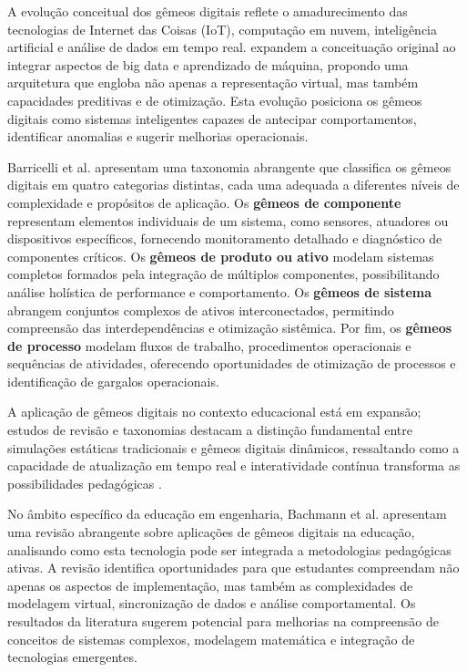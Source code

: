 \documentclass[12pt,a4paper]{article}
\begin{document}
A evolução conceitual dos gêmeos digitais reflete o amadurecimento das
tecnologias de Internet das Coisas (IoT), computação em nuvem, inteligência
artificial e análise de dados em tempo real. \citet{tao2018} expandem
a conceituação original ao integrar aspectos de big data e aprendizado de
máquina, propondo uma arquitetura que engloba não apenas a representação
virtual, mas também capacidades preditivas e de otimização. Esta evolução
posiciona os gêmeos digitais como sistemas inteligentes capazes de antecipar
comportamentos, identificar anomalias e sugerir melhorias operacionais.

Barricelli et al. \cite{barricelli2019} apresentam uma taxonomia abrangente que
classifica os gêmeos digitais em quatro categorias distintas, cada uma adequada
a diferentes níveis de complexidade e propósitos de aplicação. Os
\textbf{gêmeos de componente} representam elementos individuais de um sistema,
como sensores, atuadores ou dispositivos específicos, fornecendo monitoramento
detalhado e diagnóstico de componentes críticos. Os \textbf{gêmeos de produto
  ou ativo} modelam sistemas completos formados pela integração de múltiplos
componentes, possibilitando análise holística de performance e comportamento.
Os \textbf{gêmeos de sistema} abrangem conjuntos complexos de ativos
interconectados, permitindo compreensão das interdependências e otimização
sistêmica. Por fim, os \textbf{gêmeos de processo} modelam fluxos de trabalho,
procedimentos operacionais e sequências de atividades, oferecendo oportunidades
de otimização de processos e identificação de gargalos operacionais.

A aplicação de gêmeos digitais no contexto educacional está em expansão; estudos de revisão e taxonomias destacam a distinção fundamental entre simulações estáticas tradicionais e gêmeos digitais dinâmicos, ressaltando como a capacidade de atualização em tempo real e interatividade contínua transforma as possibilidades pedagógicas \cite{barricelli2019}.

No âmbito específico da educação em engenharia, Bachmann et al.
apresentam uma revisão abrangente sobre aplicações de
gêmeos digitais na educação, analisando como esta tecnologia pode ser integrada
a metodologias pedagógicas ativas. A revisão identifica oportunidades para que
estudantes compreendam não apenas os aspectos de implementação, mas também as
complexidades de modelagem virtual, sincronização de dados e análise
comportamental. Os resultados da literatura sugerem potencial para melhorias na
compreensão de conceitos de sistemas complexos, modelagem matemática e
integração de tecnologias emergentes.
\end{document}
